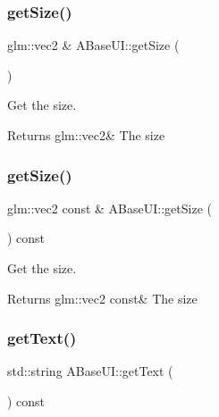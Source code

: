 \subsubsection{\texorpdfstring{get\+Size()}{getSize()}\hspace{0.1cm}{\footnotesize\ttfamily [1/2]}}
{\footnotesize\ttfamily glm\+::vec2 \& A\+Base\+U\+I\+::get\+Size (\begin{DoxyParamCaption}{ }\end{DoxyParamCaption})\hspace{0.3cm}{\ttfamily [virtual]}}



Get the size. 

\begin{DoxyReturn}{Returns}
glm\+::vec2\& The size 
\end{DoxyReturn}
\mbox{\label{class_a_base_u_i_adccd2d278366f6fe12db1f3a55baafd2}} 
\subsubsection{\texorpdfstring{get\+Size()}{getSize()}\hspace{0.1cm}{\footnotesize\ttfamily [2/2]}}
{\footnotesize\ttfamily glm\+::vec2 const  \& A\+Base\+U\+I\+::get\+Size (\begin{DoxyParamCaption}{ }\end{DoxyParamCaption}) const\hspace{0.3cm}{\ttfamily [virtual]}}



Get the size. 

\begin{DoxyReturn}{Returns}
glm\+::vec2 const\& The size 
\end{DoxyReturn}
\mbox{\label{class_a_base_u_i_afcf23c37d38d3a9038d8491159029238}} 
\subsubsection{\texorpdfstring{get\+Text()}{getText()}}
{\footnotesize\ttfamily std\+::string A\+Base\+U\+I\+::get\+Text (\begin{DoxyParamCaption}{ }\end{DoxyParamCaption}) const\hspace{0.3cm}{\ttfamily [virtual]}}



